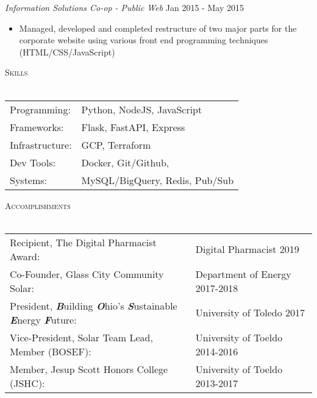 \documentclass[a4paper]{article}
\newcommand{\lineunder} {
    \vspace*{-8pt} \\
    \hspace*{-18pt} \hrulefill \\
}
\newcommand{\header} [1] {
    {\hspace*{-18pt}\vspace*{6pt} \textsc{#1}}
    \vspace*{-6pt} \lineunder
}
\begin{document}
\textit{Information Solutions Co-op - Public Web} \hfill Jan 2015 - May 2015 \\
\vspace{-3mm}
\begin{itemize} \itemsep -1mm
    \item Managed, developed and completed restructure of two major parts for the corporate website using various
     front end programming techniques (HTML/CSS/JavaScript)
\end{itemize}
\vspace{-2mm}

\header{Skills}
\begin{tabular}{l l}
    Programming: & Python, NodeJS, JavaScript \\
    Frameworks: & Flask, FastAPI, Express \\ 
    Infrastructure: & GCP, Terraform \\
    Dev Tools: & Docker, Git/Github, \\
    Systems: & MySQL/BigQuery, Redis, Pub/Sub \\
    
\end{tabular}
\vspace{2mm}

\header{Accomplishments}
\begin{tabular}{l l}
    Recipient, The Digital Pharmacist Award: & Digital Pharmacist 2019 \\
    Co-Founder, Glass City Community Solar: & Department of Energy 2017-2018 \\
    President, \textbf{\textit{B}}uilding \textbf{\textit{O}}hio's \textbf{\textit{S}}ustainable
      \textbf{\textit{E}}nergy \textbf{\textit{F}}uture: & University of Toledo  2017 \\
    Vice-President, Solar Team Lead, Member (BOSEF): & University of Toeldo 2014-2016 \\
    Member, Jesup Scott Honors College (JSHC): & University of Toeldo 2013-2017 \\
\end{tabular}

\end{document}
